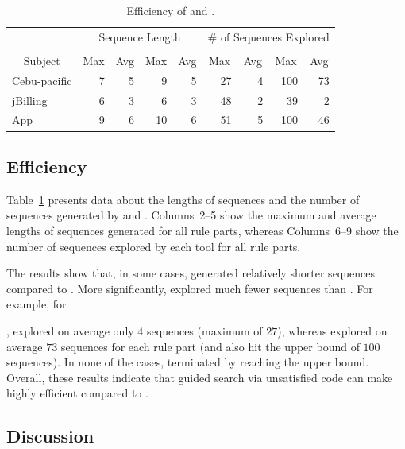 \begin{table}[t]
\caption{Efficiency of \tool{} and \exhaust{}.}
\centering
{\scriptsize
\tabcolsep=3pt
\begin{tabular}{|l|r|r|r|r|r|r|r|r|}
\hline
& \multicolumn{4}{|c|}{Sequence Length} & \multicolumn{4}{|c|}{\# of Sequences Explored} \\
\cline{2-9}
& \multicolumn{2}{|c|}{\tool{}} & \multicolumn{2}{|c|}{\exhaust{}} & \multicolumn{2}{|c|}{\tool{}} & \multicolumn{2}{|c|}{\exhaust{}}  \\
\cline{2-9}
\multicolumn{1}{|c|}{Subject} & \multicolumn{1}{|c|}{Max} & \multicolumn{1}{|c|}{Avg} & \multicolumn{1}{|c|}{Max} & \multicolumn{1}{|c|}{Avg} & \multicolumn{1}{|c|}{Max} & \multicolumn{1}{|c|}{Avg} & \multicolumn{1}{|c|}{Max} & \multicolumn{1}{|c|}{Avg} \\
\hline \hline
Cebu-pacific 	 &  7		& 5 &  9 &  5	 &  27 &  4	&  100 & 73 \\
jBilling		 	 &  6		& 3 &  6 &  3	 &  48 &  2	&  39  &  2 \\
App					 	 &  9		& 6 & 10 &  6	 &  51 &  5	& 100  & 46 \\
\hline
\end{tabular}
}
\label{tab:stats}
\end{table}

\subsection{Efficiency}

Table~\ref{tab:stats} presents data about the lengths of sequences and the
number of sequences generated by \tool{} and \exhaust{}. Columns~2--5 show the
maximum and average lengths of sequences generated for all rule parts, whereas
Columns~6--9 show the number of sequences explored by each tool for all rule
parts.

The results show that, in some cases, \tool{} generated relatively shorter
sequences compared to \exhaust{}. More significantly, \tool{} explored much
fewer sequences than \exhaust{}. For example, for \subject{Cebu-pacific},
\tool{} explored on average only $4$ sequences (maximum of $27$), whereas
\exhaust{} explored on average $73$ sequences for each rule part (and also hit
the upper bound of $100$ sequences). In none of the cases, \tool{} terminated by
reaching the upper bound. Overall, these results indicate that guided search via
unsatisfied code can make \tool{} highly efficient compared to \exhaust{}.

\subsection{Discussion}

